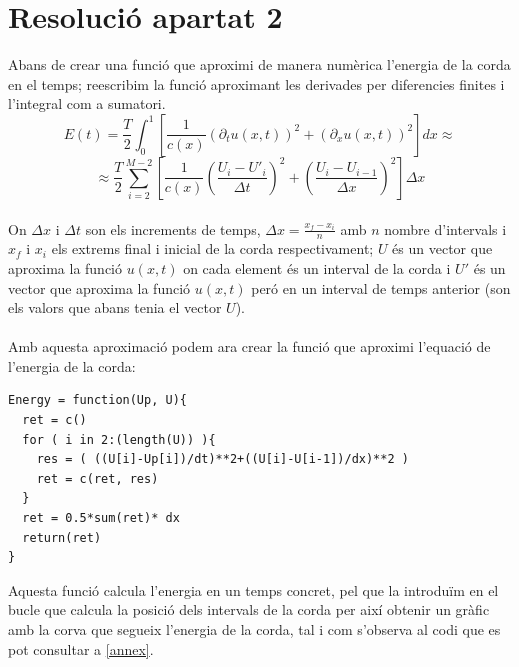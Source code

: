 \documentclass[a4paper, 11pt]{article}
\begin{document}
\section{Resolució apartat 2}
Abans de crear una funció que aproximi de manera numèrica l'energia de la corda en el temps; reescribim la funció aproximant les derivades per diferencies finites i l'integral com a sumatori.\\
\begin{equation*}
    E(t) = \frac{T}{2}\int_0^1 \left[ \frac{1}{c(x)} \left( \partial_t u(x,t) \right)^2 + \left( \partial_x u(x,t) \right)^2 \right] dx
    \approx
\end{equation*}\begin{equation*}
    \approx \frac{T}{2}\sum_{i = 2}^{M-2} \left[ \frac{1}{c(x)} \left( \frac{U_i - U'_i}{\Delta t} \right)^2 + \left( \frac{U_i - U_{i-1}}{\Delta x} \right)^2 \right] \Delta x
\end{equation*}
\\
On $\Delta x$ i $\Delta t$ son els increments de temps, $\Delta x = \frac{x_f- x_i}{n}$ amb $n$ nombre d'intervals i $x_f$ i $x_i$ els extrems final i inicial de la corda respectivament; $U$ és un vector que aproxima la funció $u(x,t)$ on cada element és un interval de la corda i $U'$ és un vector que aproxima la funció $u(x,t)$ peró en un interval de temps anterior (son els valors que abans tenia el vector $U$).\\\\
Amb aquesta aproximació podem ara crear la funció que aproximi l'equació de l'energia de la corda:\\
\begin{lstlisting}[language = GERONA]
Energy = function(Up, U){
  ret = c()
  for ( i in 2:(length(U)) ){
    res = ( ((U[i]-Up[i])/dt)**2+((U[i]-U[i-1])/dx)**2 )
    ret = c(ret, res)
  }
  ret = 0.5*sum(ret)* dx
  return(ret)
}
\end{lstlisting}
\vspace{1em}
Aquesta funció calcula l'energia en un temps concret, pel que la introduïm en el bucle que calcula la posició dels intervals de la corda per així obtenir un gràfic amb la corva que segueix l'energia de la corda, tal i com s'observa al codi que es pot consultar a \textcolor{blue}{\ref{annex}}.
\newpage
\end{document}
